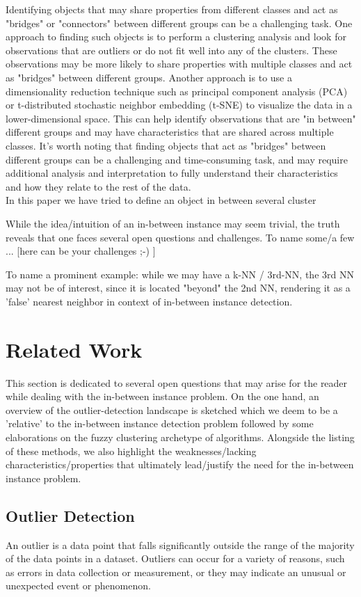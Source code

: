 \documentclass[11pt]{article}
\theoremstyle{definition}
\begin{document}
 Identifying objects that may share properties from different classes and act as "bridges" or "connectors" between different groups can be a challenging task. One approach to finding such objects is to perform a clustering analysis and look for observations that are outliers or do not fit well into any of the clusters. These observations may be more likely to share properties with multiple classes and act as "bridges" between different groups. Another approach is to use a dimensionality reduction technique such as principal component analysis (PCA) or t-distributed stochastic neighbor embedding (t-SNE) to visualize the data in a lower-dimensional space. This can help identify observations that are "in between" different groups and may have characteristics that are shared across multiple classes. It's worth noting that finding objects that act as "bridges" between different groups can be a challenging and time-consuming task, and may require additional analysis and interpretation to fully understand their characteristics and how they relate to the rest of the data. \\
 
 In this paper we have tried to define an object in between several cluster
 
While the idea/intuition of an in-between instance may seem trivial, the truth reveals that one faces several open questions and challenges. To name some/a few ... [here can be your challenges ;-)  ]

To name a prominent example: while we may have a k-NN / 3rd-NN, the 3rd NN may not be of interest, since it is located "beyond" the 2nd NN, rendering it as a 'false' nearest neighbor in context of in-between instance detection.

\section{Related Work}
This section is dedicated to several open questions that may arise for the reader while dealing with the in-between instance problem. On the one hand, an overview of the outlier-detection landscape is sketched which we deem to be a 'relative' to the in-between instance detection problem followed by some elaborations on the fuzzy clustering archetype of algorithms. Alongside the listing of these methods, we also highlight the weaknesses/lacking characteristics/properties that ultimately lead/justify the need for the in-between instance problem.


\subsection{Outlier Detection}
An outlier is a data point that falls significantly outside the range of the majority of the data points in a dataset. Outliers can occur for a variety of reasons, such as errors in data collection or measurement, or they may indicate an unusual or unexpected event or phenomenon.
\end{document}
